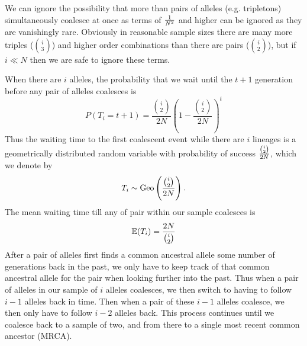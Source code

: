 We can ignore the possibility that more than pairs of alleles (e.g. tripletons)
simultaneously coalesce at once as terms of $\nicefrac{1}{N^2}$ and higher
can be ignored as they are vanishingly rare. Obviously in reasonable
sample sizes there are many more triples (${i \choose 3}$) and higher order
combinations than there are pairs (${i \choose 2}$), but if $i \ll N$ then we are safe to
ignore these terms.


When there are $i$ alleles, the probability that we wait until the
$t+1$ generation before
any pair of alleles coalesces is
\begin{equation}
P(T_i =t+1) = \frac{{i \choose
 2}}{2N}\left( 1- \frac{{i \choose
 2}}{2N}\right)^{t} \label{eqn:T_i}
\end{equation}
Thus the waiting time to the first coalescent event while there are $i$ lineages is a geometrically distributed random variable with probability of success $\nicefrac{{i \choose 2}}{2N}$, which we denote by
\begin{equation}
T_i \sim \text{Geo}
\left(  \nicefrac{{i \choose
      2}}{2N} \right).
\end{equation}
The mean waiting time till any of pair within our
 sample coalesces is 
\begin{equation}
\E( T_i) = \frac{2N}{{i \choose  2}}  \label{eqn:E_T_i}
\end{equation}
After a pair of alleles first finds a common ancestral allele some
number of generations back in the past, we only have to keep
track of that common ancestral allele for the pair when looking further into the past. Thus when a pair
of alleles in our sample of $i$ alleles coalesces, we then switch to
having to follow $i-1$ alleles back in time. Then when a pair of these $i-1$
alleles coalesce, we then only have to follow $i-2$ alleles back. This
process continues until we coalesce back to a sample of two, and from
there to a single most recent common ancestor (MRCA).\\



